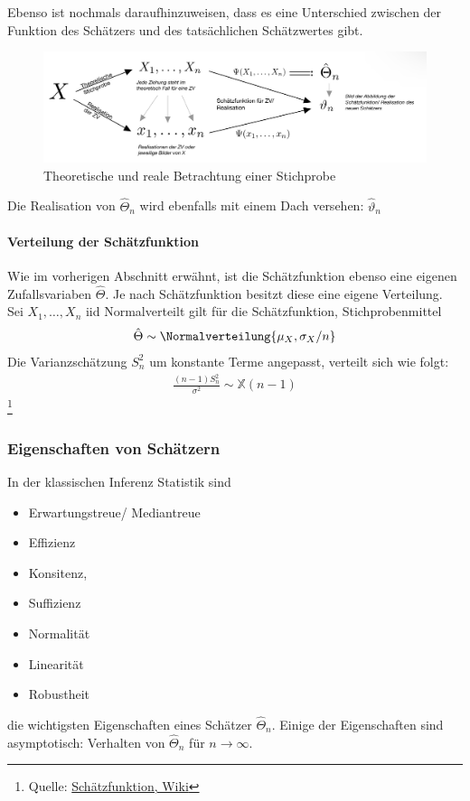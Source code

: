 Ebenso ist nochmals daraufhinzuweisen, dass es eine Unterschied zwischen der Funktion des Schätzers und des tatsächlichen Schätzwertes gibt.

\begin{figure}[H]
	\centering
	\includegraphics[width=0.7\linewidth]{attachment/chapter_13/Scc072}
	\caption{Theoretische und reale Betrachtung einer Stichprobe}
\end{figure}

Die Realisation von $\hat{\Theta}_n$ wird ebenfalls mit einem Dach versehen: $\hat{\vartheta}_n$

\paragraph{Verteilung der Schätzfunktion}
Wie im vorherigen Abschnitt erwähnt, ist die Schätzfunktion ebenso eine eigenen Zufallsvariaben $\hat{\Theta}$. Je nach Schätzfunktion besitzt diese eine eigene Verteilung. \\

Sei $X_1,\dots, X_n$ \gls{iid} Normalverteilt gilt für die Schätzfunktion, Stichprobenmittel
\begin{align}
	\hat{\Theta}\sim \Normalverteilung{\mu_X, \sigma_X/n}
\end{align}
Die Varianzschätzung $S_n^2$ um konstante Terme angepasst, verteilt sich wie folgt:
\begin{align}
	\frac{(n-1)S_n^2}{\sigma^2}\sim \mathbb{X}(n-1)
\end{align}
\footnote{
	Quelle: \href{https://de.wikipedia.org/wiki/SchätzfunktionVerteilungderSchätzfunktionen}{Schätzfunktion, Wiki}}
\subsubsection{Eigenschaften von Schätzern}
In der klassischen Inferenz Statistik sind
\begin{itemize}
	\item Erwartungstreue/ Mediantreue
	\item Effizienz
	\item Konsitenz,
	\item Suffizienz
	\item Normalität
	\item Linearität
	\item Robustheit
\end{itemize}
die wichtigsten Eigenschaften eines Schätzer $\hat{\Theta}_n$. Einige der Eigenschaften sind asymptotisch: Verhalten von $\hat{\Theta}_n$ für $n\rightarrow \infty$.

